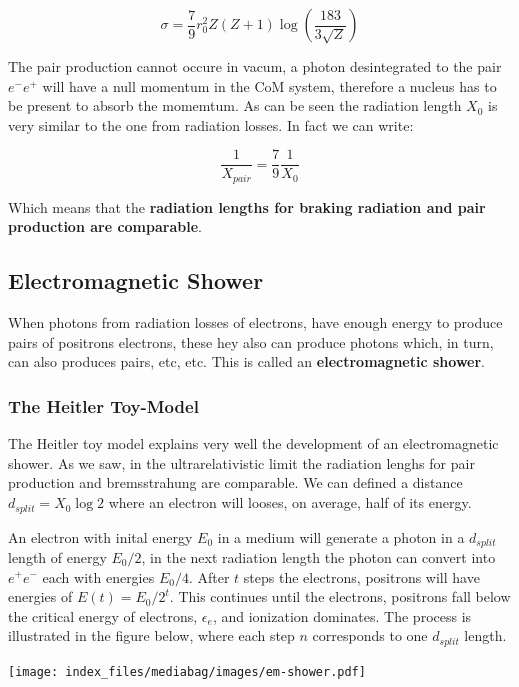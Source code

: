 \documentclass[
  letterpaper,
  DIV=11,
  numbers=noendperiod]{scrreprt}
\begin{document}
\[\sigma = \frac{7}{9} r_0^2 Z (Z+ 1)\log \left(\frac{183}{3\sqrt{Z}}\right)\]

The pair production cannot occure in vacum, a photon desintegrated to
the pair \(e^-e^+\) will have a null momentum in the CoM system,
therefore a nucleus has to be present to absorb the momemtum. As can be
seen the radiation length \(X_0\) is very similar to the one from
radiation losses. In fact we can write:

\[\frac{1}{X_{pair}} = \frac{7}{9}\frac{1}{X_0}\]

Which means that the \textbf{radiation lengths for braking radiation and
pair production are comparable}.

\subsection{Electromagnetic Shower}\label{electromagnetic-shower}

When photons from radiation losses of electrons, have enough energy to
produce pairs of positrons electrons, these hey also can produce photons
which, in turn, can also produces pairs, etc, etc. This is called an
\textbf{electromagnetic shower}.

\subsubsection{The Heitler Toy-Model}\label{the-heitler-toy-model}

The Heitler toy model explains very well the development of an
electromagnetic shower. As we saw, in the ultrarelativistic limit the
radiation lenghs for pair production and bremsstrahung are comparable.
We can defined a distance \(d_{split} = X_0 \log2\) where an electron
will looses, on average, half of its energy.

An electron with inital energy \(E_0\) in a medium will generate a
photon in a \(d_{split}\) length of energy \(E_0/2\), in the next
radiation length the photon can convert into \(e^+e^-\) each with
energies \(E_0/4\). After \(t\) steps the electrons, positrons will have
energies of \(E(t)=E_0/2^t\). This continues until the electrons,
positrons fall below the critical energy of electrons, \(\epsilon_e\),
and ionization dominates. The process is illustrated in the figure
below, where each step \(n\) corresponds to one \(d_{split}\) length.

\begin{center}
\texttt{[image: index\_files/mediabag/images/em-shower.pdf]}
\end{center}
\end{document}
